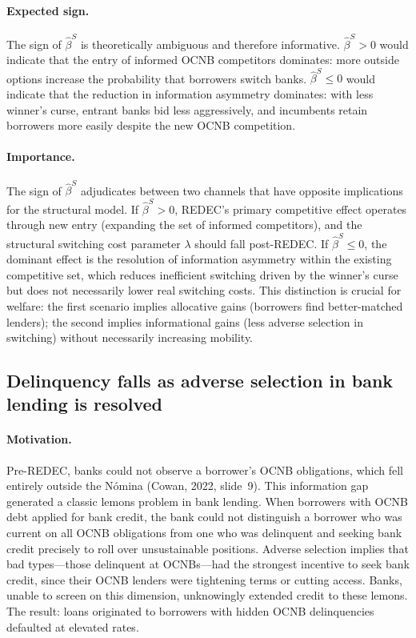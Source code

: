 \documentclass[12pt]{article}
\theoremstyle{plain}
\theoremstyle{plain}
\begin{document}
\paragraph{Expected sign.} The sign of $\hat{\beta}^{S}$ is theoretically ambiguous and therefore informative. $\hat{\beta}^{S} > 0$ would indicate that the entry of informed OCNB competitors dominates: more outside options increase the probability that borrowers switch banks. $\hat{\beta}^{S} \leq 0$ would indicate that the reduction in information asymmetry dominates: with less winner's curse, entrant banks bid less aggressively, and incumbents retain borrowers more easily despite the new OCNB competition.

\paragraph{Importance.} The sign of $\hat{\beta}^{S}$ adjudicates between two channels that have opposite implications for the structural model. If $\hat{\beta}^{S} > 0$, REDEC's primary competitive effect operates through new entry (expanding the set of informed competitors), and the structural switching cost parameter $\lambda$ should fall post-REDEC. If $\hat{\beta}^{S} \leq 0$, the dominant effect is the resolution of information asymmetry within the existing competitive set, which reduces inefficient switching driven by the winner's curse but does not necessarily lower real switching costs. This distinction is crucial for welfare: the first scenario implies allocative gains (borrowers find better-matched lenders); the second implies informational gains (less adverse selection in switching) without necessarily increasing mobility.

\subsection{Delinquency falls as adverse selection in bank lending is resolved}

\paragraph{Motivation.} Pre-REDEC, banks could not observe a borrower's OCNB obligations, which fell entirely outside the N\'omina (Cowan, 2022, slide~9). This information gap generated a classic lemons problem in bank lending. When borrowers with OCNB debt applied for bank credit, the bank could not distinguish a borrower who was current on all OCNB obligations from one who was delinquent and seeking bank credit precisely to roll over unsustainable positions. Adverse selection implies that bad types---those delinquent at OCNBs---had the strongest incentive to seek bank credit, since their OCNB lenders were tightening terms or cutting access. Banks, unable to screen on this dimension, unknowingly extended credit to these lemons. The result: loans originated to borrowers with hidden OCNB delinquencies defaulted at elevated rates.
\end{document}
